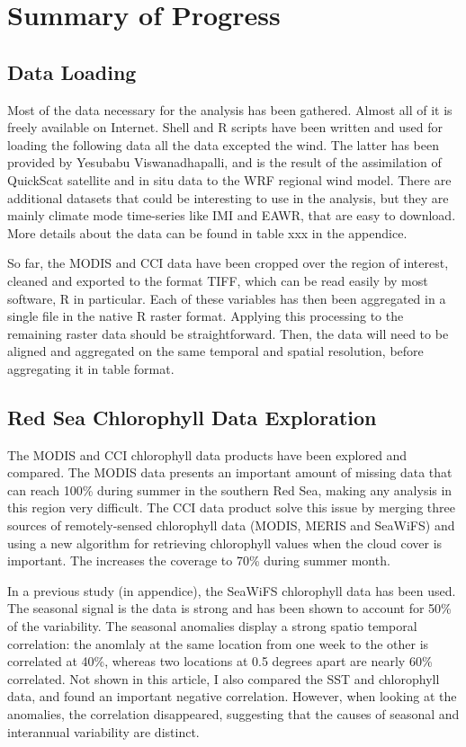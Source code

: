 \chapter{Summary of Progress}

\section{Data Loading}

Most of the data necessary for the analysis has been gathered. Almost all of it
is freely available on Internet. Shell and R scripts have been written and used
for loading the following data all the data excepted the wind. The latter has
been provided by Yesubabu Viswanadhapalli, and is the result of the
assimilation of QuickScat satellite and in situ data to the WRF regional wind
model. There are additional datasets that could be interesting to use in the
analysis, but they are mainly climate mode time-series like IMI and EAWR, that
are easy to download. More details about the data can be found in table xxx in
the appendice.

So far, the MODIS and CCI data have been cropped over the region of interest,
cleaned and exported to the format TIFF, which can be read easily by most
software, R in particular. Each of these variables has then been aggregated in
a single file in the native R raster format. Applying this processing to the
remaining raster data should be straightforward. Then, the data will need to be
aligned and aggregated on the same temporal and spatial resolution, before
aggregating it in table format.

\section{Red Sea Chlorophyll Data Exploration}

The MODIS and CCI chlorophyll data products have been explored and compared.
The MODIS data presents an important amount of missing data that can reach
100\% during summer in the southern Red Sea, making any analysis in this region
very difficult. The CCI data product solve this issue by merging three sources
of remotely-sensed chlorophyll data (MODIS, MERIS and SeaWiFS) and using a new
algorithm for retrieving chlorophyll values when the cloud cover is important.
The increases the coverage to 70\% during summer month.

In a previous study (in appendice), the SeaWiFS chlorophyll data has been used.
The seasonal signal is the data is strong and has been shown to account for
50\% of the variability. The seasonal anomalies display a strong spatio
temporal correlation: the anomlaly at the same location from one week to the
other is correlated at 40\%, whereas two locations at 0.5 degrees apart are
nearly 60\% correlated. Not shown in this article, I also compared the SST and
chlorophyll data, and found an important negative correlation. However, when
looking at the anomalies, the correlation disappeared, suggesting that the
causes of seasonal and interannual variability are distinct.


